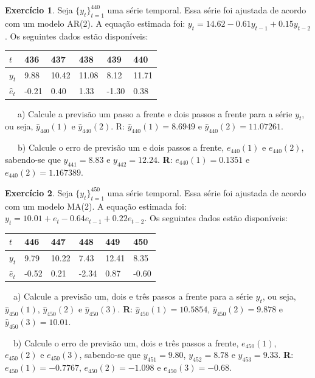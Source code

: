 \documentclass[
]{book}
\theoremstyle{definition}
\theoremstyle{definition}
\theoremstyle{definition}
\newtheorem{exercise}{Exercício}[chapter]
\theoremstyle{remark}
\begin{document}
\begin{exercise}
\protect\hypertarget{exr:exar2}{}{\label{exr:exar2} }Seja \(\{y_t\}_{t=1}^{440}\) uma série temporal. Essa série foi ajustada de acordo com um modelo AR(2). A equação estimada foi:
\(y_t=14.62-0.61y_{t-1}+0.15y_{t-2}\). Os seguintes dados estão disponíveis:

\begin{longtable}[]{@{}llllll@{}}
\toprule
\(t\) & 436 & 437 & 438 & 439 & 440\tabularnewline
\midrule
\endhead
\(y_t\) & 9.88 & 10.42 & 11.08 & 8.12 & 11.71\tabularnewline
\(\widehat{e}_t\) & -0.21 & 0.40 & 1.33 & -1.30 & 0.38\tabularnewline
\bottomrule
\end{longtable}

~~~a) Calcule a previsão um passo a frente e dois passos a frente para a série \(y_t\), ou seja, \(\widehat{y}_{440}(1)\) e \(\widehat{y}_{440}(2)\). R: \(\widehat{y}_{440}(1)=8.6949\) e \(\widehat{y}_{440}(2)=11.07261\).

~~~b) Calcule o erro de previsão um e dois passos a frente, \(e_{440}(1)\) e \(e_{440}(2)\), sabendo-se que \(y_{441}=8.83\) e \(y_{442}=12.24\). \textbf{R}: \(e_{440}(1)=0.1351\) e \(e_{440}(2)=1.167389\).
\end{exercise}

\begin{exercise}
\protect\hypertarget{exr:exarma2}{}{\label{exr:exarma2} }Seja \(\{y_t\}_{t=1}^{450}\) uma série temporal. Essa série foi ajustada de acordo com um modelo MA(2). A equação estimada foi: \(y_t=10.01+e_t-0.64e_{t-1}+0.22e_{t-2}\). Os seguintes dados estão disponíveis:

\begin{longtable}[]{@{}llllll@{}}
\toprule
\(t\) & 446 & 447 & 448 & 449 & 450\tabularnewline
\midrule
\endhead
\(y_t\) & 9.79 & 10.22 & 7.43 & 12.41 & 8.35\tabularnewline
\(\widehat{e}_t\) & -0.52 & 0.21 & -2.34 & 0.87 & -0.60\tabularnewline
\bottomrule
\end{longtable}

~~a) Calcule a previsão um, dois e três passos a frente para a série \(y_t\), ou seja, \(\widehat{y}_{450}(1)\), \(\widehat{y}_{450}(2)\) e \(\widehat{y}_{450}(3)\). \textbf{R}: \(\widehat{y}_{450}(1)=10.5854\), \(\widehat{y}_{450}(2)=9.878\) e \(\widehat{y}_{450}(3)=10.01\).

~~b) Calcule o erro de previsão um, dois e três passos a frente, \(e_{450}(1)\), \(e_{450}(2)\) e \(e_{450}(3)\), sabendo-se que \(y_{451}=9.80\), \(y_{452}=8.78\) e \(y_{453}=9.33\). \textbf{R}: \(e_{450}(1)=-0.7767\), \(e_{450}(2)=-1.098\) e \(e_{450}(3)=-0.68\).
\end{exercise}
\end{document}
